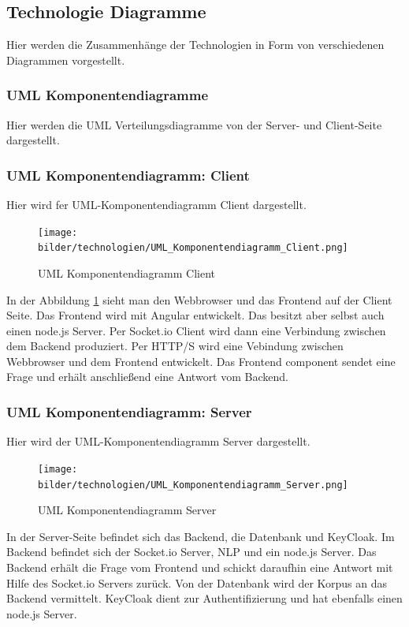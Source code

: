 \newpage
\subsection{Technologie Diagramme}
 Hier werden die Zusammenhänge der Technologien in Form von verschiedenen Diagrammen vorgestellt.

\subsubsection{UML Komponentendiagramme}
Hier werden die UML Verteilungsdiagramme von der Server- und Client-Seite dargestellt.

\subsubsection{UML Komponentendiagramm: Client}
Hier wird fer UML-Komponentendiagramm Client dargestellt.

\begin{figure}[H]
    \centering
    \texttt{[image: bilder/technologien/UML\_Komponentendiagramm\_Client.png]}
    \caption{UML Komponentendiagramm Client}
    \label{fig:UML_Komponentendiagramm_Client}
    \end{figure}
\noindent In der Abbildung \ref{fig:UML_Komponentendiagramm_Client} sieht man den Webbrowser und das Frontend auf der Client Seite.
Das Frontend wird mit Angular entwickelt. Das besitzt aber selbst auch einen node.js Server.
Per Socket.io Client wird dann eine Verbindung zwischen dem Backend produziert. Per HTTP/S
wird eine Vebindung zwischen Webbrowser und dem Frontend entwickelt. Das Frontend component 
sendet eine Frage und erhält anschließend eine Antwort vom Backend.   

\newpage

\subsubsection{UML Komponentendiagramm: Server}
Hier wird der UML-Komponentendiagramm Server dargestellt.

\begin{figure}[H]
    \centering
    \texttt{[image: bilder/technologien/UML\_Komponentendiagramm\_Server.png]}
    \caption{UML Komponentendiagramm Server}
    \label{fig:UML_Komponentendiagramm_Server}
    \end{figure}
\noindent In der Server-Seite befindet sich das Backend, die Datenbank und KeyCloak.
Im Backend befindet sich der Socket.io Server, NLP und ein node.js Server.
Das Backend erhält die Frage vom Frontend und schickt daraufhin eine Antwort mit Hilfe des Socket.io Servers zurück.
Von der Datenbank wird der Korpus an das Backend vermittelt. KeyCloak dient zur Authentifizierung und
hat ebenfalls einen node.js Server. 

